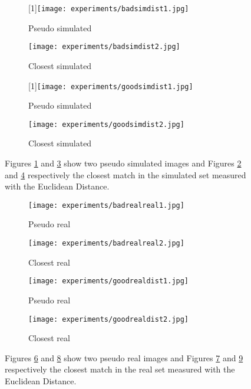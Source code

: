 \begin{figure}[h]
  \centering
  \begin{subfigure}{.24\linewidth}
      \centering
      \scalebox{-1}[1]{\texttt{[image: experiments/badsimdist1.jpg]}}
      \caption{Pseudo simulated}\label{fig:badsimdist1}
  \end{subfigure}%
  \hfill
  \begin{subfigure}{.24\linewidth}
    \centering
    \texttt{[image: experiments/badsimdist2.jpg]}
    \caption{Closest simulated}\label{fig:badsimdist2}
  \end{subfigure}%
  \hfill
  \begin{subfigure}{.24\linewidth}
      \centering
      \scalebox{-1}[1]{\texttt{[image: experiments/goodsimdist1.jpg]}}
      \caption{Pseudo simulated}\label{fig:goodsimdist1}
  \end{subfigure}%
  \hfill
  \begin{subfigure}{.24\linewidth}
    \centering
    \texttt{[image: experiments/goodsimdist2.jpg]}
    \caption{Closest simulated}\label{fig:goodsimdist2}
\end{subfigure}
  \caption{Figures \ref{fig:badsimdist1} and \ref{fig:goodsimdist1} show two pseudo simulated images and Figures \ref{fig:badsimdist2} and \ref{fig:goodsimdist2} respectively the closest match in the simulated set measured with the Euclidean Distance.}
  \label{fig:simdistance}
\end{figure}

\begin{figure}[h]
  \centering
  \begin{subfigure}{.24\linewidth}
      \centering
      \texttt{[image: experiments/badrealreal1.jpg]}
      \caption{Pseudo real}\label{fig:badrealdist1}
  \end{subfigure}%
  \hfill
  \begin{subfigure}{.24\linewidth}
    \centering
    \texttt{[image: experiments/badrealreal2.jpg]}
    \caption{Closest real}\label{fig:badrealdist2}
  \end{subfigure}%
  \hfill
  \begin{subfigure}{.24\linewidth}
      \centering
      \texttt{[image: experiments/goodrealdist1.jpg]}
      \caption{Pseudo real}\label{fig:goodrealdist1}
  \end{subfigure}%
  \hfill
  \begin{subfigure}{.24\linewidth}
    \centering
    \texttt{[image: experiments/goodrealdist2.jpg]}
    \caption{Closest real}\label{fig:goodrealdist2}
\end{subfigure}
  \caption{Figures \ref{fig:badrealdist1} and \ref{fig:goodrealdist1} show two pseudo real images and Figures \ref{fig:badrealdist2} and \ref{fig:goodrealdist2} respectively the closest match in the real set measured with the Euclidean Distance.}
  \label{fig:realdistance}
\end{figure}



